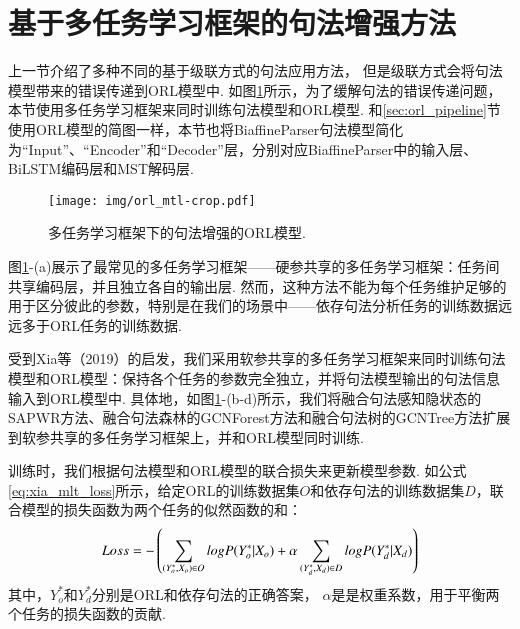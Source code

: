 \section{基于多任务学习框架的句法增强方法}
\label{sec:orl_mtl}
%
上一节介绍了多种不同的基于级联方式的句法应用方法，
但是级联方式会将句法模型带来的错误传递到ORL模型中.
如图\ref{fig:orl_mtl}所示，为了缓解句法的错误传递问题，本节使用多任务学习框架来同时训练句法模型和ORL模型. 和\ref{sec:orl_pipeline}节使用ORL模型的简图一样，本节也将BiaffineParser句法模型简化为“Input”、“Encoder”和“Decoder”层，分别对应BiaffineParser中的输入层、BiLSTM编码层和MST解码层.

\begin{figure}[hb!]
    \centering
    \texttt{[image: img/orl\_mtl-crop.pdf]}
    \caption{多任务学习框架下的句法增强的ORL模型. }
    \label{fig:orl_mtl}
\end{figure}

图\ref{fig:orl_mtl}-(a)展示了最常见的多任务学习框架——硬参共享的多任务学习框架：任务间共享编码层，并且独立各自的输出层.
然而，这种方法不能为每个任务维护足够的用于区分彼此的参数，特别是在我们的场景中——依存句法分析任务的训练数据远远多于ORL任务的训练数据.

受到Xia等（2019）的启发，我们采用软参共享的多任务学习框架来同时训练句法模型和ORL模型：保持各个任务的参数完全独立，并将句法模型输出的句法信息输入到ORL模型中.
具体地，如图\ref{fig:orl_mtl}-(b-d)所示，我们将融合句法感知隐状态的SAPWR方法、融合句法森林的GCNForest方法和融合句法树的GCNTree方法扩展到软参共享的多任务学习框架上，并和ORL模型同时训练.

训练时，我们根据句法模型和ORL模型的联合损失来更新模型参数. 如公式\ref{eq:xia_mlt_loss}所示，给定ORL的训练数据集$O$和依存句法的训练数据集$D$，联合模型的损失函数为两个任务的似然函数的和：
\begin{equation}
    \setlength{\abovedisplayskip}{9pt}
    \setlength{\belowdisplayskip}{9pt}
    \label{eq:xia_mlt_loss}
    Loss = -\left(\sum_{(Y_o^*,X_o) \in O} log P(Y_o^*|X_o) + \alpha \sum_{(Y_d^*,X_d) \in D} log P(Y_d^*|X_d) \right)
\end{equation}
其中，$Y_o^*$和$Y_d^*$分别是ORL和依存句法的正确答案， $\alpha$是是权重系数，用于平衡两个任务的损失函数的贡献.

